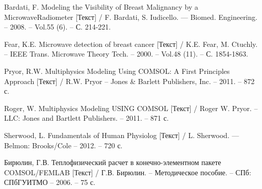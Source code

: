 \newpage
{}
\begin{thebibliography}{3}
	 Bardati, F. Modeling the Visibility of Breast Malignancy by a MicrowaveRadiometer [Текст] / F. Bardati, S. Iudicello. — Biomed. Engineering. -- 2008. -- Vol.55 (6). -- С. 214-221.
	
	 Fear, K.E. Microwave detection of breast cancer [Текст] / K.E. Fear, M. Ctuchly. -- IEEE Trans. Microwave Theory Tech. -- 2000. -- Vol.48 (11). -- С. 1854-1863.
	
	 Pryor, R.W. Multiphysics Modeling Using COMSOL: A First Principles Approach [Текст] / R.W. Pryor -- Jones \& Barlett Publishers, Inc. -- 2011. -- 872 с.
	
	 Roger, W. Multiphysics Modeling USING COMSOL [Текст] / Roger W. Pryor. -- LLC: Jones and Bartlett Publishers. -- 2011. -- 871 с.
	
	 Sherwood, L. Fundamentals of Human Physiolog [Текст] / L. Sherwood. — Belmon: Brooks/Cole -- 2012. -- 720 с.
	
	 Бирюлин, Г.В. Теплофизический расчет в конечно-элементном пакете COMSOL/FEMLAB [Текст] / Г.В. Бирюлин. -- Методическое пособие. -- СПб: СПбГУИТМО -- 2006. -- 75 с.
\end{thebibliography}
